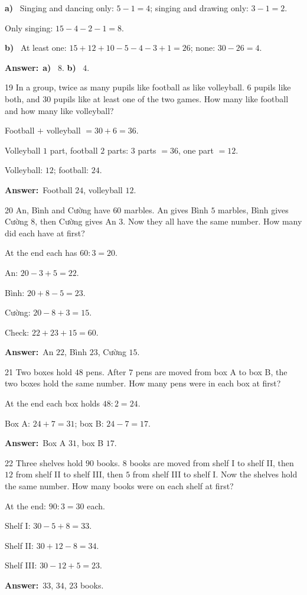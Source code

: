 \documentclass[11pt]{article}
\newif\ifsol \solfalse
\providecommand{\AnsWord}{Đáp số}
\newcommand{\dapso}[1]{\par\textbf{\AnsWord:}\ #1}
\newcommand{\probsol}[1]{%
  \begin{lrbox}{\solmeasure}\begin{minipage}{\dimexpr\linewidth-24pt\relax}#1\end{minipage}\end{lrbox}%
  \ifsol
    \begin{solbox}#1\end{solbox}%
  \else
    \setlength{\solht}{\dimexpr\ht\solmeasure+\dp\solmeasure+0.85cm\relax}%
    \ifdim\solht<1.35cm\setlength{\solht}{1.35cm}\fi
    \begin{tcolorbox}[colback=white,colframe=Line,boxrule=0.8pt,arc=5pt,
      left=8pt,right=8pt,top=4pt,bottom=4pt,height=\solht]{\footnotesize\color{Slate}\itshape\WorkWord}\end{tcolorbox}%
  \fi}
\newcommand{\pa}[1]{\textbf{#1)}\ }
\newcommand{\gap}{\vspace{0.3cm}}
\def\WorkWord{Your work:}
\def\AnsWord{Answer}
\begin{document}
\probsol{
\pa{a} Singing and dancing only: $5-1=4$; singing and drawing only: $3-1=2$.\par Only singing: $15-4-2-1=8$.\par
\pa{b} At least one: $15+12+10-5-4-3+1=26$; none: $30-26=4$.
\dapso{\pa{a} $8$. \pa{b} $4$.}}
\gap
\begin{probbox}{19}{\relax}
In a group, twice as many pupils like football as like volleyball. $6$ pupils like both, and $30$ pupils like at least one of the two games. How many like football and how many like volleyball?
\end{probbox}
\probsol{
Football $+$ volleyball $=30+6=36$.\par Volleyball $1$ part, football $2$ parts: $3$ parts $=36$, one part $=12$.\par
Volleyball: $12$; football: $24$.
\dapso{Football $24$, volleyball $12$.}}
\gap
\begin{probbox}{20}{\relax}
An, Bình and Cường have $60$ marbles. An gives Bình $5$ marbles, Bình gives Cường $8$, then Cường gives An $3$. Now they all have the same number. How many did each have at first?
\end{probbox}
\probsol{
At the end each has $60:3=20$.\par
An: $20-3+5=22$.\par Bình: $20+8-5=23$.\par Cường: $20-8+3=15$.\par Check: $22+23+15=60$.
\dapso{An $22$, Bình $23$, Cường $15$.}}
\gap
\begin{probbox}{21}{\relax}
Two boxes hold $48$ pens. After $7$ pens are moved from box A to box B, the two boxes hold the same number. How many pens were in each box at first?
\end{probbox}
\probsol{
At the end each box holds $48:2=24$.\par Box A: $24+7=31$; box B: $24-7=17$.
\dapso{Box A $31$, box B $17$.}}
\gap
\begin{probbox}{22}{\relax}
Three shelves hold $90$ books. $8$ books are moved from shelf I to shelf II, then $12$ from shelf II to shelf III, then $5$ from shelf III to shelf I. Now the shelves hold the same number. How many books were on each shelf at first?
\end{probbox}
\probsol{
At the end: $90:3=30$ each.\par
Shelf I: $30-5+8=33$.\par Shelf II: $30+12-8=34$.\par Shelf III: $30-12+5=23$.
\dapso{$33$, $34$, $23$ books.}}
\end{document}
